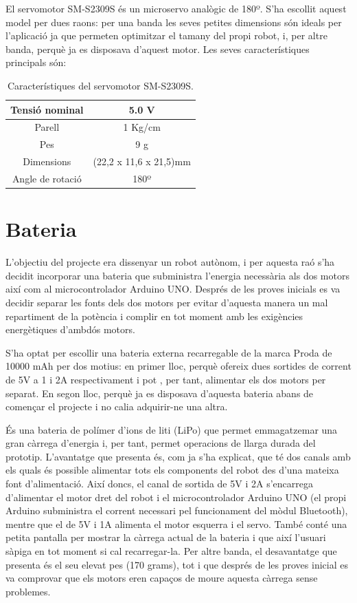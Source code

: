 El servomotor SM-S2309S és un microservo analògic de 180º. S'ha escollit aquest model per dues raons: per una banda les seves petites dimensions són ideals per l'aplicació ja que permeten optimitzar el tamany del propi robot, i, per altre banda, perquè ja es disposava d'aquest motor. Les seves característiques principals són:  

\begin{table}[htbp]
	\begin{center}
		\begin{tabular}{|c|c|}
			\hline
			
			Tensió nominal & 5.0 V  \\ \hline
			Parell & 1 Kg/cm  \\ \hline
			Pes & 9 g  \\ \hline
			Dimensions & (22,2 x 11,6 x 21,5)mm  \\ \hline
			Angle de rotació & 180º  \\ \hline
		\end{tabular}
		\caption{Característiques del servomotor SM-S2309S.}
		\label{tabla:servo}
	\end{center}
\end{table}
\section{Bateria}\label{sec:bateria}

L’objectiu del projecte era dissenyar un robot autònom, i per aquesta raó s’ha decidit incorporar una bateria que subministra l’energia necessària als dos motors així com al microcontrolador Arduino UNO. Després de les proves inicials es va decidir separar les fonts dels dos motors per evitar d’aquesta manera un mal repartiment de la potència i complir en tot moment amb les exigències energètiques d’ambdós motors. 

S’ha optat per escollir una bateria externa recarregable de la marca Proda de 10000 mAh per dos motius: en primer lloc, perquè ofereix dues sortides de corrent de 5V a 1 i 2A respectivament i pot , per tant, alimentar els dos motors per separat. En segon lloc, perquè ja es disposava d'aquesta bateria abans de començar el projecte i no calia adquirir-ne una altra. 

És una bateria de polímer d’ions de liti (LiPo) que permet emmagatzemar una gran càrrega d’energia i, per tant, permet operacions de llarga durada del prototip. L’avantatge que presenta és, com ja s’ha explicat, que té dos canals amb els quals és possible alimentar tots els components del robot des d'una mateixa font d'alimentació. Així doncs, el canal de sortida de 5V i 2A s’encarrega d’alimentar el motor dret del robot i el microcontrolador Arduino UNO (el propi Arduino subministra el corrent necessari pel funcionament del mòdul Bluetooth), mentre que el de 5V i 1A alimenta el motor esquerra i el servo. També conté una petita pantalla per mostrar la càrrega actual de la bateria i que així l’usuari sàpiga en tot moment si cal recarregar-la. Per altre banda, el desavantatge que presenta és el seu elevat pes (170 grams), tot i que després de les proves inicial es va comprovar que els motors eren capaços de moure aquesta càrrega sense problemes. 

